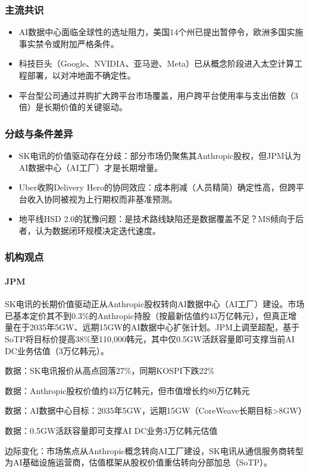 \documentclass[11pt]{ctexart}
\begin{document}
\subsubsection*{主流共识}
\begin{itemize}
  \item AI数据中心面临全球性的选址阻力，美国14个州已提出暂停令，欧洲多国实施事实禁令或附加严格条件。
  \item 科技巨头（Google、NVIDIA、亚马逊、Meta）已从概念阶段进入太空计算工程部署，以对冲地面不确定性。
  \item 平台型公司通过并购扩大跨平台市场覆盖，用户跨平台使用率与支出倍数（3倍）是长期价值的关键驱动。
\end{itemize}
\subsubsection*{分歧与条件差异}
\begin{itemize}
  \item SK电讯的价值驱动存在分歧：部分市场仍聚焦其Anthropic股权，但JPM认为AI数据中心（AI工厂）才是长期增量。
  \item Uber收购Delivery Hero的协同效应：成本削减（人员精简）确定性高，但跨平台收入协同被视为上行期权而非基准预测。
  \item 地平线HSD 2.0的犹豫问题：是技术路线缺陷还是数据覆盖不足？MS倾向于后者，认为数据闭环规模决定迭代速度。
\end{itemize}
\subsubsection*{机构观点}
\paragraph{JPM} SK电讯的长期价值驱动正从Anthropic股权转向AI数据中心（AI工厂）建设。市场已基本定价其不到0.3\%的Anthropic持股（按最新估值约43万亿韩元），但真正增量在于2035年5GW、远期15GW的AI数据中心扩张计划。JPM上调至超配，基于SoTP将目标价提高38\%至110,000韩元，其中仅0.5GW活跃容量即可支撑当前AI DC业务估值（3万亿韩元）。
{\small\color{refgray}数据：SK电讯报价从高点回落27\%，同期KOSPI下跌22\%\par}
{\small\color{refgray}数据：Anthropic股权价值约43万亿韩元，但市值增长约80万亿韩元\par}
{\small\color{refgray}数据：AI数据中心目标：2035年5GW，远期15GW（CoreWeave长期目标>8GW）\par}
{\small\color{refgray}数据：0.5GW活跃容量即可支撑AI DC业务3万亿韩元估值\par}
{\small\color{refgray}边际变化：市场焦点从Anthropic概念转向AI工厂建设，SK电讯从通信服务商转型为AI基础设施运营商，估值框架从股权价值重估转向分部加总（SoTP）。\par}
\end{document}
